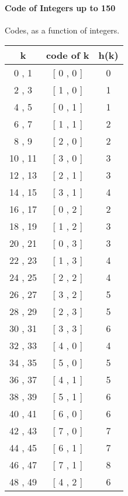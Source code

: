 \paragraph{Code of Integers up to 150}
\label{table:IntegersToCode}
Codes, as a function of integers.
\begin{center}
	\begin{multicols}{3}
		\begin{tabular}{|c|c|c|}
			\hline
			\textbf{k} & \textbf{code of k} & \textbf{h(k)} \\
			\hline
			 0 ,  1 & [ 0 , 0 ] & 0 \\
			 2 ,  3 & [ 1 , 0 ] & 1 \\
			 4 ,  5 & [ 0 , 1 ] & 1 \\
			 6 ,  7 & [ 1 , 1 ] & 2 \\
			 8 ,  9 & [ 2 , 0 ] & 2 \\
			10 , 11 & [ 3 , 0 ] & 3 \\
			12 , 13 & [ 2 , 1 ] & 3 \\
			14 , 15 & [ 3 , 1 ] & 4 \\
			16 , 17 & [ 0 , 2 ] & 2 \\
			18 , 19 & [ 1 , 2 ] & 3 \\
			20 , 21 & [ 0 , 3 ] & 3 \\
			22 , 23 & [ 1 , 3 ] & 4 \\
			24 , 25 & [ 2 , 2 ] & 4 \\
			26 , 27 & [ 3 , 2 ] & 5 \\
			28 , 29 & [ 2 , 3 ] & 5 \\
			30 , 31 & [ 3 , 3 ] & 6 \\
			32 , 33 & [ 4 , 0 ] & 4 \\
			34 , 35 & [ 5 , 0 ] & 5 \\
			36 , 37 & [ 4 , 1 ] & 5 \\
			38 , 39 & [ 5 , 1 ] & 6 \\
			40 , 41 & [ 6 , 0 ] & 6 \\
			42 , 43 & [ 7 , 0 ] & 7 \\
			44 , 45 & [ 6 , 1 ] & 7 \\
			46 , 47 & [ 7 , 1 ] & 8 \\
			48 , 49 & [ 4 , 2 ] & 6 \\
			\hline
		\end{tabular}
		

\end{multicols}
\end{center}
